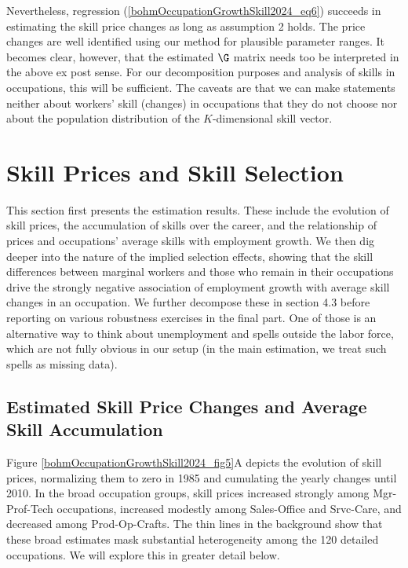 \documentclass[12pt]{article}
\theoremstyle{definition}
\begin{document}
Nevertheless, regression (\ref{bohmOccupationGrowthSkill2024_eq6}) succeeds in estimating the skill price changes as long as assumption 2 holds. The price changes are well identified using our method for plausible parameter ranges. It becomes clear, however, that the estimated $\G$ matrix needs too be interpreted in the above ex post sense. For our decomposition purposes and analysis of skills in occupations, this will be sufficient. The caveats are that we can make statements neither about workers' skill (changes) in occupations that they do not choose nor about the population distribution of the $K$-dimensional skill vector. 

\section{Skill Prices and Skill Selection}

This section first presents the estimation results. These include the evolution of skill prices, the accumulation of skills over the career, and the relationship of prices and occupations' average skills with employment growth. We then dig deeper into the nature of the implied selection effects, showing that the skill differences between marginal workers and those who remain in their occupations drive the strongly negative association of employment growth with average skill changes in an occupation. We further decompose these in section 4.3 before reporting on various robustness exercises in the final part. One of those is an alternative way to think about unemployment and spells outside the labor force, which are not fully obvious in our setup (in the main estimation, we treat such spells as missing data).

\subsection{Estimated Skill Price Changes and Average Skill Accumulation}

Figure \ref{bohmOccupationGrowthSkill2024_fig5}A depicts the evolution of skill prices, normalizing them to zero in 1985 and cumulating the yearly changes until 2010. In the broad occupation groups, skill prices increased strongly among Mgr-Prof-Tech occupations, increased modestly among Sales-Office and Srvc-Care, and decreased among Prod-Op-Crafts. The thin lines in the background show that these broad estimates mask substantial heterogeneity among the 120 detailed occupations. We will explore this in greater detail below.
\end{document}
